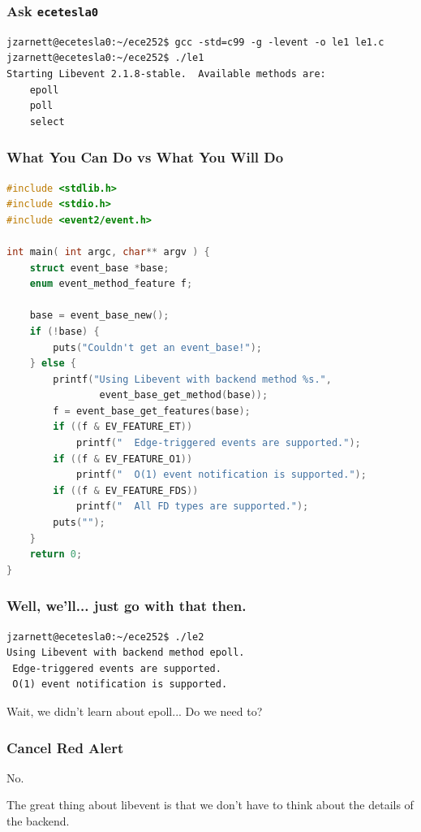 \begin{frame}[fragile]
	\frametitle{Ask \texttt{ecetesla0}}

	{\small
		\begin{verbatim}
jzarnett@ecetesla0:~/ece252$ gcc -std=c99 -g -levent -o le1 le1.c
jzarnett@ecetesla0:~/ece252$ ./le1 
Starting Libevent 2.1.8-stable.  Available methods are:
    epoll
    poll
    select
\end{verbatim}
	}

\end{frame}

\begin{frame}[fragile]
	\frametitle{What You Can Do vs What You Will Do}

	\begin{lstlisting}[language=C]
#include <stdlib.h>
#include <stdio.h>
#include <event2/event.h>

int main( int argc, char** argv ) { 
    struct event_base *base;
    enum event_method_feature f;

    base = event_base_new();
    if (!base) {
        puts("Couldn't get an event_base!");
    } else {
        printf("Using Libevent with backend method %s.",
                event_base_get_method(base));
        f = event_base_get_features(base);
        if ((f & EV_FEATURE_ET))
            printf("  Edge-triggered events are supported.");
        if ((f & EV_FEATURE_O1))
            printf("  O(1) event notification is supported.");
        if ((f & EV_FEATURE_FDS))
            printf("  All FD types are supported.");
        puts("");
    }   
    return 0;
}
\end{lstlisting}


\end{frame}

\begin{frame}[fragile]
	\frametitle{Well, we'll... just go with that then.}

	\begin{verbatim}
jzarnett@ecetesla0:~/ece252$ ./le2
Using Libevent with backend method epoll.  
 Edge-triggered events are supported.  
 O(1) event notification is supported.
\end{verbatim}

	Wait, we didn't learn about epoll... Do we need to?

\end{frame}


\begin{frame}
	\frametitle{Cancel Red Alert}

	No.

	The great thing about libevent is that we don't have to think about the details of the backend.


\end{frame}


